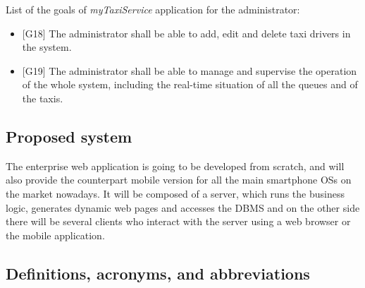 \documentclass[a4paper,11pt]{report} %
\newcommand{\mts}{\mbox{\normalfont\itshape myTaxiService}}
\begin{document}
		List of the goals of \mts{} application for the administrator:
		\begin{itemize}
			\item {[}G18{]} The administrator shall be able to add, edit and delete taxi drivers in the system.
			\item {[}G19{]} The administrator shall be able to manage and supervise the operation of the whole system, including the real-time situation of all the queues and of the taxis.
		\end{itemize}
		
		
		
	\subsection{Proposed system}
	The enterprise web application is going to be developed from scratch, and will also provide the counterpart mobile version for all the main smartphone OSs on the market nowadays. It will be composed of a server, which runs the business logic, generates dynamic web pages and accesses the DBMS and on the other side there will be several clients who interact with the server using a web browser or the mobile application.
	
	\subsection{Definitions, acronyms, and abbreviations}
	
\end{document}
